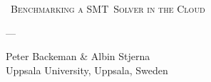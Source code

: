{
	\centering
	\vspace{1cm}
	{\scshape\Huge\ Benchmarking a SMT~Solver in the Cloud \par}
	\vspace{1cm}
	{\scshape\Large --- \par}
	\vspace{0.9cm}
	\begin{center}{Peter Backeman \& Albin Stjerna}\\
	Uppsala University, Uppsala, Sweden
	\end{center}
}